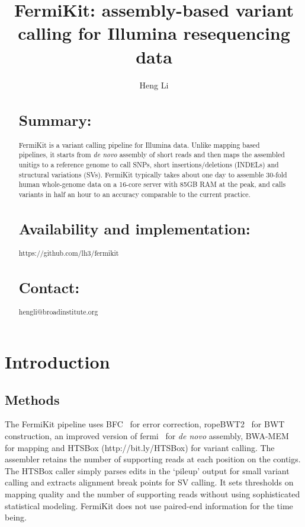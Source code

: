 \documentclass{bioinfo}
\begin{document}

\title[FermiKit: assembly based variant calling]{FermiKit: assembly-based variant calling for Illumina resequencing data}

\author[Li]{Heng Li}

\address{Broad Institute, 75 Ames Street, Cambridge, MA 02142, USA}

\maketitle

\begin{abstract}
\section{Summary:}
FermiKit is a variant calling pipeline for Illumina data. Unlike mapping based
pipelines, it starts from {\it de novo} assembly of short reads and then
maps the assembled unitigs to a reference genome to call SNPs, short
insertions/deletions (INDELs) and structural variations (SVs). FermiKit
typically takes about one day to assemble 30-fold human whole-genome data on a
16-core server with 85GB RAM at the peak, and calls variants in half an hour to
an accuracy comparable to the current practice.

\section{Availability and implementation:} https://github.com/lh3/fermikit

\section{Contact:} hengli@broadinstitute.org
\end{abstract}

\section{Introduction}

\begin{methods}
\section{Methods}
The FermiKit pipeline uses BFC~\citep{Li:2015aa-tmp} for error correction,
ropeBWT2~\citep{Li:2014ab} for BWT construction, an improved version of
fermi~\citep{Li:2012fk} for {\it de novo} assembly, BWA-MEM~\citep{Li:2013aa}
for mapping and HTSBox (http://bit.ly/HTSBox) for variant calling. The
assembler retains the number of supporting reads at each position on the
contigs. The HTSBox caller simply parses edits in the `pileup' output for small
variant calling and extracts alignment break points for SV calling. It sets
thresholds on mapping quality and the number of supporting reads without
using sophisticated statistical modeling. FermiKit does not use paired-end
information for the time being.

\end{methods}
\end{document}
